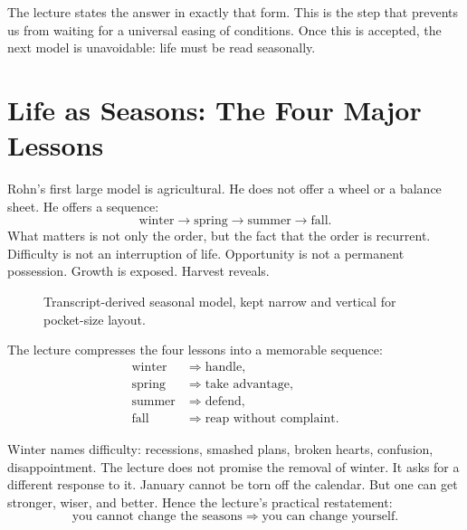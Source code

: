 The lecture states the answer in exactly that form. This is the step that prevents us from waiting for a universal easing of conditions. Once this is accepted, the next model is unavoidable: life must be read seasonally.

\section{Life as Seasons: The Four Major Lessons}

Rohn's first large model is agricultural. He does not offer a wheel or a balance sheet. He offers a sequence:
\begin{equation}
\text{winter} \to \text{spring} \to \text{summer} \to \text{fall}.
\end{equation}
What matters is not only the order, but the fact that the order is recurrent. Difficulty is not an interruption of life. Opportunity is not a permanent possession. Growth is exposed. Harvest reveals.

\begin{figure}[h]
\centering
{}
\caption{Transcript-derived seasonal model, kept narrow and vertical for pocket-size layout.}
\end{figure}

The lecture compresses the four lessons into a memorable sequence:
\begin{align}
\text{winter} &\Rightarrow \text{handle},\\
\text{spring} &\Rightarrow \text{take advantage},\\
\text{summer} &\Rightarrow \text{defend},\\
\text{fall} &\Rightarrow \text{reap without complaint}.
\end{align}

Winter names difficulty: recessions, smashed plans, broken hearts, confusion, disappointment. The lecture does not promise the removal of winter. It asks for a different response to it. January cannot be torn off the calendar. But one can get stronger, wiser, and better. Hence the lecture's practical restatement:
\begin{equation}
\text{you cannot change the seasons} \Rightarrow \text{you can change yourself}.
\end{equation}

